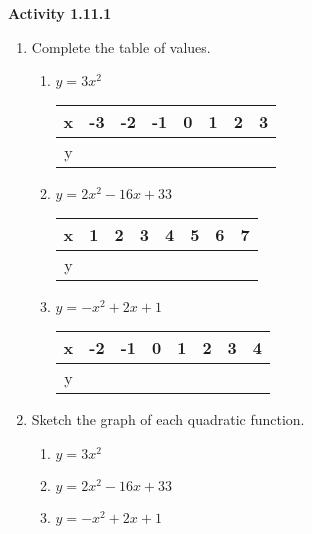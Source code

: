 \vspace{1ex}
\noindent\textbf{Activity 1.11.1}

\vspace{0.75ex}

\begin{enumerate}[label = \color{blue}\Alph*. ]
\item Complete the table of values. 
\begin{enumerate}[label = \color{blue}\arabic*. ]
\item $y = 3x^{2}$

\begin{tabular}{|*8{c|}} 
\hline 
x & -3 & -2 & -1 & 0 & 1 & 2 & 3 \\
\hline 
y & & & & & & & \\
\hline 
\end{tabular}
\item $ y = 2x^{2} - 16x + 33 $

\begin{tabular}{|*8{c|}} 
\hline 
x & 1 & 2 & 3 & 4 & 5 & 6 & 7 \\
\hline 
y & & & & & & & \\
\hline 
\end{tabular}
\item $ y = -x^{2} + 2x + 1 $

\begin{tabular}{|*8{c|}} 
\hline 
x & -2 & -1 & 0 & 1 & 2 & 3 & 4 \\
\hline 
y & & & & & & & \\
\hline 
\end{tabular}

\end{enumerate}

\item Sketch the graph of each quadratic function. 
\begin{enumerate}[label = \color{blue}\arabic*. ]
\item $y = 3x^{2}$
\item $ y = 2x^{2} - 16x + 33 $
\item $ y = -x^{2} + 2x + 1 $
\end{enumerate}

\end{enumerate}

